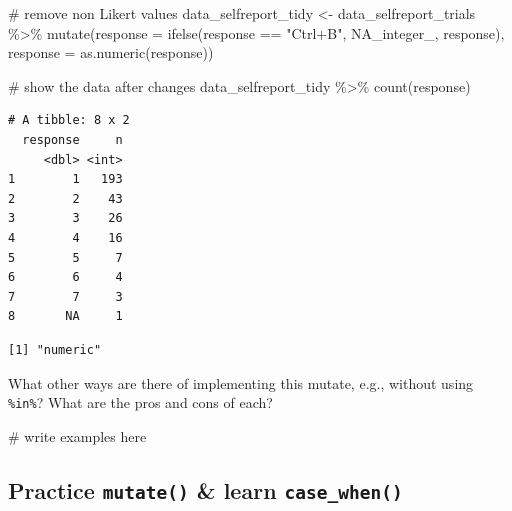 \documentclass[
  letterpaper,
  DIV=11,
  numbers=noendperiod]{scrreprt}
\newenvironment{Shaded}{\begin{snugshade}}{\end{snugshade}}
\newcommand{\AttributeTok}[1]{\textcolor[rgb]{0.40,0.45,0.13}{#1}}
\newcommand{\CommentTok}[1]{\textcolor[rgb]{0.37,0.37,0.37}{#1}}
\newcommand{\ConstantTok}[1]{\textcolor[rgb]{0.56,0.35,0.01}{#1}}
\newcommand{\FunctionTok}[1]{\textcolor[rgb]{0.28,0.35,0.67}{#1}}
\newcommand{\NormalTok}[1]{\textcolor[rgb]{0.00,0.23,0.31}{#1}}
\newcommand{\OtherTok}[1]{\textcolor[rgb]{0.00,0.23,0.31}{#1}}
\newcommand{\SpecialCharTok}[1]{\textcolor[rgb]{0.37,0.37,0.37}{#1}}
\newcommand{\StringTok}[1]{\textcolor[rgb]{0.13,0.47,0.30}{#1}}
\begin{document}
\begin{Shaded}
\begin{Highlighting}[]
\CommentTok{\# remove non Likert values}
\NormalTok{data\_selfreport\_tidy }\OtherTok{\textless{}{-}}\NormalTok{ data\_selfreport\_trials }\SpecialCharTok{\%\textgreater{}\%}
  \FunctionTok{mutate}\NormalTok{(}\AttributeTok{response =} \FunctionTok{ifelse}\NormalTok{(response }\SpecialCharTok{==} \StringTok{"Ctrl+\textquotesingle{}B\textquotesingle{}"}\NormalTok{, }\ConstantTok{NA\_integer\_}\NormalTok{, response),}
         \AttributeTok{response =} \FunctionTok{as.numeric}\NormalTok{(response))}


\CommentTok{\# show the data after changes}
\NormalTok{data\_selfreport\_tidy }\SpecialCharTok{\%\textgreater{}\%}
  \FunctionTok{count}\NormalTok{(response)}
\end{Highlighting}
\end{Shaded}

\begin{verbatim}
# A tibble: 8 x 2
  response     n
     <dbl> <int>
1        1   193
2        2    43
3        3    26
4        4    16
5        5     7
6        6     4
7        7     3
8       NA     1
\end{verbatim}

\begin{Shaded}
\end{Shaded}

\begin{verbatim}
[1] "numeric"
\end{verbatim}

What other ways are there of implementing this mutate, e.g., without
using \texttt{\%in\%}? What are the pros and cons of each?

\begin{Shaded}
\begin{Highlighting}[]
\CommentTok{\# write examples here}
\end{Highlighting}
\end{Shaded}

\subsection{\texorpdfstring{Practice \texttt{mutate()} \& learn
\texttt{case\_when()}}{Practice mutate() \& learn case\_when()}}\label{practice-mutate-learn-case_when}
\end{document}
